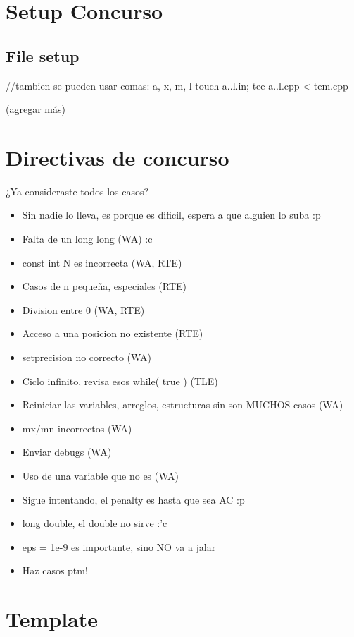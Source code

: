 

\def\title{Universidad de Guadalajara - Los Mismísimos Carajillos}
\section{Setup Concurso}%
\subsection*{File setup}
\begin{code}
//tambien se pueden usar comas: {a, x, m, l}
touch {a..l}.in; tee {a..l}.cpp < tem.cpp
\end{code}
(agregar más)

\section{Directivas de concurso}
¿Ya consideraste todos los casos?

\begin{itemize}
\item Sin nadie lo lleva, es porque es dificil, espera a que alguien lo suba :p
\item Falta de un long long (WA) :c
\item const int N es incorrecta (WA, RTE)
\item Casos de n pequeña, especiales (RTE)
\item Division entre 0 (WA, RTE)
\item Acceso a una posicion no existente (RTE)
\item setprecision no correcto (WA)
\item Ciclo infinito, revisa esos while( true ) (TLE)
\item Reiniciar las variables, arreglos, estructuras sin son MUCHOS casos (WA)
\item mx/mn incorrectos (WA)
\item Enviar debugs (WA)
\item Uso de una variable que no es (WA)
\item Sigue intentando, el penalty es hasta que sea AC :p
\item long double, el double no sirve :'c
\item eps = 1e-9 es importante, sino NO va a jalar
\item Haz casos ptm!
\end{itemize}
\section{Template}

